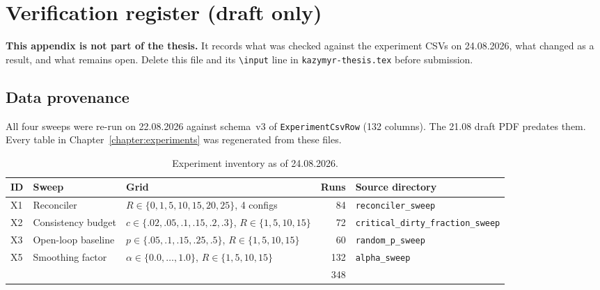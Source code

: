 %

\chapter{Verification register (draft only)}\label{chapter:register}

\begin{reviewnote}
\textbf{This appendix is not part of the thesis.} It records what was
checked against the experiment CSVs on 24.08.2026, what changed as a
result, and what remains open. Delete this file and its \texttt{\textbackslash input}
line in \texttt{kazymyr-thesis.tex} before submission.
\end{reviewnote}

\section{Data provenance}\label{sec:reg-provenance}

All four sweeps were re-run on 22.08.2026 against schema~v3 of
\texttt{ExperimentCsvRow} (132 columns). The 21.08 draft PDF predates
them. Every table in Chapter~\ref{chapter:experiments} was regenerated
from these files.

\begin{table}[htbp]
\centering
\caption{Experiment inventory as of 24.08.2026.}
\label{tab:reg-inventory}
\small
\begin{tabular}{l l l r l}
\toprule
ID & Sweep & Grid & Runs & Source directory \\
\midrule
X1 & Reconciler       & $R \in \{0,1,5,10,15,20,25\}$, 4 configs & 84  & \texttt{reconciler\_sweep} \\
X2 & Consistency budget & $c \in \{.02,.05,.1,.15,.2,.3\}$, $R \in \{1,5,10,15\}$ & 72 & \texttt{critical\_dirty\_fraction\_sweep} \\
X3 & Open-loop baseline & $p \in \{.05,.1,.15,.25,.5\}$, $R \in \{1,5,10,15\}$ & 60 & \texttt{random\_p\_sweep} \\
X5 & Smoothing factor   & $\alpha \in \{0.0,\dots,1.0\}$, $R \in \{1,5,10,15\}$ & 132 & \texttt{alpha\_sweep} \\
\midrule
   &                    &                                          & 348 & \\
\bottomrule
\end{tabular}
\end{table}


